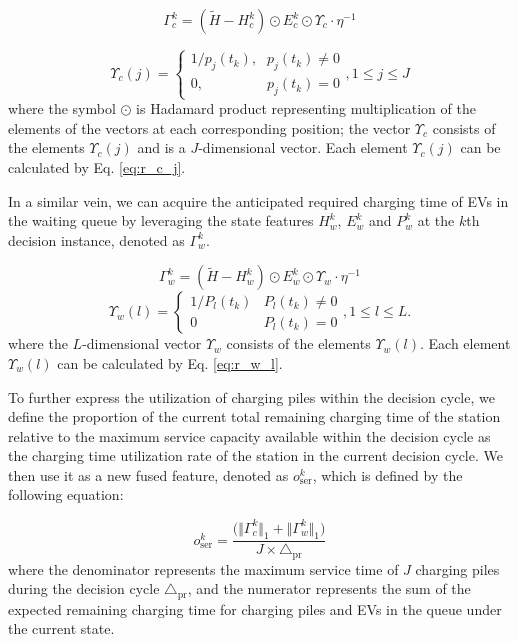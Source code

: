 \documentclass[preprint,12pt]{elsarticle}
\begin{document}
\begin{equation}
\Gamma_{c}^{k}=(\tilde{H}-H_{c}^{k})\odot E_{c}^{k}\odot\Upsilon_{c}\cdot\eta^{-1}\label{eq:cp_remain_charging_time}
\end{equation}

\begin{equation}
\varUpsilon_{c}(j)=\begin{cases}
1/p_{j}(t_{k})\text{,} & p_{j}(t_{k})\neq0\\
0, & p_{j}(t_{k})=0
\end{cases},1\leq j\leq J\label{eq:r_c_j}
\end{equation}
where the symbol $\odot$ is Hadamard product representing multiplication of the elements of the vectors at each corresponding position; the vector $\varUpsilon_{c}$ consists of the elements $\varUpsilon_{c}(j)$ and is a $J$-dimensional vector. Each element $\varUpsilon_{c}(j)$ can be calculated by Eq. \ref{eq:r_c_j}.

In a similar vein, we can acquire the anticipated required charging time of EVs in the waiting queue by leveraging the state features $H_{w}^{k}$, $E_{w}^{k}$ and $P_{w}^{k}$ at the $k$th decision instance, denoted as $\Gamma_{w}^{k}$.

\begin{equation}
\Gamma_{w}^{k}=(\tilde{H}-H_{w}^{k})\odot E_{w}^{k}\odot\Upsilon_{w}\cdot\eta^{-1}
\end{equation}
\begin{equation}
\varUpsilon_{w}(l)=\begin{cases}
1/P_{l}(t_{k}) & P_{l}(t_{k})\neq0\\
0 & P_{l}(t_{k})=0
\end{cases},1\leq l\leq L.\label{eq:r_w_l}
\end{equation}
where the $L$-dimensional vector $\varUpsilon_{w}$ consists of the elements $\varUpsilon_{w}(l)$. Each element $\varUpsilon_{w}(l)$ can be calculated by Eq. \ref{eq:r_w_l}.



To further express the utilization of charging piles within the decision cycle, we define the proportion of the current total remaining charging time of the station relative to the maximum service capacity available within the decision cycle as the charging time utilization rate of the station in the current decision cycle. We then use it as a new fused feature, denoted as $o_{\textrm{ser}}^{k}$, which is defined by the following equation:

\begin{equation}
o_{\textrm{ser}}^{k}=\frac{\biggl(\biggl\Vert\Gamma_{c}^{k}\biggr\Vert_{1}+\biggl\Vert\Gamma_{w}^{k}\biggr\Vert_{1}\biggr)}{J\times\triangle_{\textrm{pr}}}
\end{equation}
where the denominator represents the maximum service time of $J$ charging piles during the decision cycle $\triangle_{\textrm{pr}}$, and the numerator represents the sum of the expected remaining charging time for charging piles and EVs in the queue under the current state.
\end{document}

